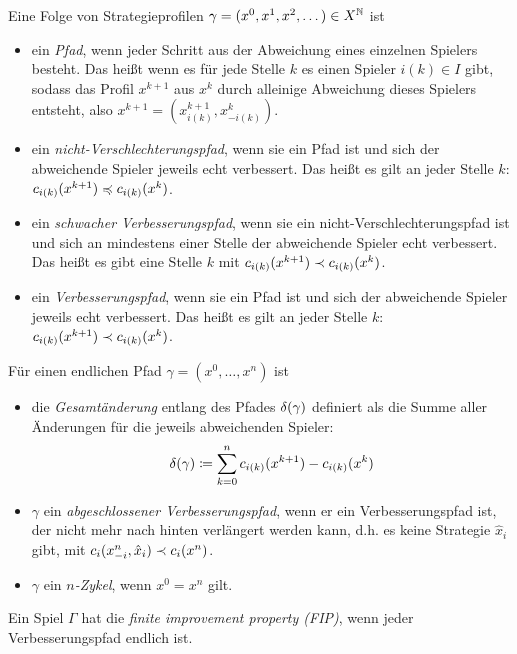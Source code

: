 \begin{defn}
	Eine Folge von Strategieprofilen $\gamma = (x^0, x^1, x^2, \dots) \in X^{\mathbb{N}}$ ist 
	\begin{itemize}
		\item ein \emph{Pfad}, wenn jeder Schritt aus der Abweichung eines einzelnen Spielers besteht. Das heißt wenn es für jede Stelle $k$ es einen Spieler $i(k) \in I$ gibt, sodass das Profil $x^{k+1}$ aus $x^k$ durch alleinige Abweichung dieses Spielers entsteht, also $x^{k+1} = (x^{k+1}_{i(k)}, x^k_{-i(k)})$.
		\item ein \emph{nicht-Verschlechterungspfad}, wenn sie ein Pfad ist und sich der abweichende Spieler jeweils echt verbessert. Das heißt es gilt an jeder Stelle $k$: $c_{i(k)}(x^{k+1}) \preccurlyeq c_{i(k)}(x^k)$.
		\item ein \emph{schwacher Verbesserungspfad}, wenn sie ein nicht-Verschlechterungspfad ist und sich an mindestens einer Stelle der abweichende Spieler echt verbessert. Das heißt es gibt eine Stelle $k$ mit $c_{i(k)}(x^{k+1}) \prec c_{i(k)}(x^k)$.
		\item ein \emph{Verbesserungspfad}, wenn sie ein Pfad ist und sich der abweichende Spieler jeweils echt verbessert. Das heißt es gilt an jeder Stelle $k$: $c_{i(k)}(x^{k+1}) \prec c_{i(k)}(x^k)$.
	\end{itemize}
	
	Für einen endlichen Pfad $\gamma = (x^0, \dots, x^n)$ ist
	\begin{itemize}
		\item die \emph{Gesamtänderung} entlang des Pfades $\delta(\gamma)$ definiert als die Summe aller Änderungen für die jeweils abweichenden Spieler:
		\[\delta(\gamma) \coloneqq \sum_{k=0}^{n} c_{i(k)}(x^{k+1}) - c_{i(k)}(x^k) \]
		\item $\gamma$ ein \emph{abgeschlossener Verbesserungspfad}, wenn er ein Verbesserungspfad ist, der nicht mehr nach hinten verlängert werden kann, d.h. es keine Strategie $\hat{x}_i$ gibt, mit $c_{i}(x^n_{-i}, \hat{x}_i) \prec c_{i}(x^n)$.
		\item $\gamma$ ein \emph{$n$-Zykel}, wenn $x^0 = x^n$ gilt.
	\end{itemize}
\end{defn}


\begin{defn}
	Ein Spiel $\Gamma$ hat die \emph{finite improvement property (FIP)}, wenn jeder Verbesserungspfad endlich ist.
\end{defn}

